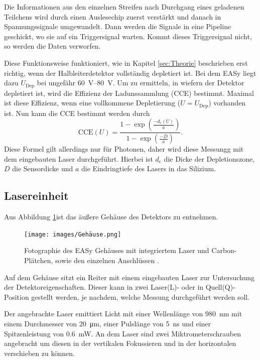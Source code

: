 \FloatBarrier
Die Informationen aus den einzelnen Streifen nach Durchgang eines geladenen
Teilchens wird durch einen Auslesechip zuerst verstärkt und danach in
Spannungssignale umgewandelt. Dann werden die Signale in eine Pipeline geschickt,
wo sie auf ein Triggersignal warten. Kommt dieses Triggersignal nicht, so werden
die Daten verworfen.

Diese Funktionsweise funktioniert, wie in Kapitel \ref{sec:Theorie} beschrieben
erst richtig, wenn der Halbleiterdetektor vollständig depletiert ist. Bei dem
EASy liegt dazu $U_\text{Dep}$ bei ungefähr \SIrange{60}{80}{\volt}. Um zu
ermitteln, in wiefern der Detektor depletiert ist, wird die Effizienz der
Ladunssammlung (CCE) bestimmt. Maximal ist diese Effizienz, wenn eine vollkommene
Depletierung ($U = U_\text{Dep}$) vorhanden ist. Nun kann die CCE bestimmt werden
durch
\begin{equation}
  \text{CCE}(U) = \frac{1 - \exp\left(\frac{-d_\text{c}(U)}{a}\right)}{1 - \exp\left(\frac{-D}{a}\right)}.
\end{equation}
Diese Formel gilt allerdings nur für Photonen, daher wird diese Messungg mit dem
eingebauten Laser durchgeführt.
Hierbei ist $d_\text{c}$ die Dicke der Depletionszone, $D$ die Sensordicke und
$a$ die Eindringtiefe des Lasers in das Silizium.

\subsection{Lasereinheit}
\label{sec:Lasereinheit}
Aus Abbildung \ref{fig:Gehäuse}ist das äußere Gehäuse des Detektors zu entnehmen.
\begin{figure}[htb]
  \centering
  \texttt{[image: images/Gehäuse.png]}
  \caption{Fotographie des EASy Gehäuses mit integriertem Laser und Carbon-Plätchen,
  sowie den einzelnen Anschlüssen \cite{anleitung}.}
  \label{fig:Gehäuse}
\end{figure}
\FloatBarrier
Auf dem Gehäuse sitzt ein Reiter mit einem eingebauten Laser zur Untersuchung der
Detektoreigenschaften. Dieser kann in zwei Laser(L)- oder in Quell(Q)-Position
gestellt werden, je nachdem, welche Messung durchgeführt werden soll.

Der angebrachte Laser emittiert Licht mit einer Wellenlänge von \SI{980}{\nano\meter}
mit einem Durchmesser von \SI{20}{\micro\meter}, einer Pulslänge von
\SI{5}{\nano\second} und einer Spitzenleistung von \SI{0.6}{\milli\watt}.
An dem Laser sind zwei Miktrometerschrauben angebracht um diesen in der vertikalen
Fokussieren und in der horizontalen verschieben zu können.

